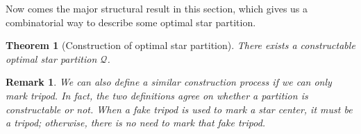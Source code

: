 \documentclass[10pt,a4paper]{article}
\newtheorem{theorem}{Theorem}[section]
\newtheorem{remark}{Remark}[section]
\begin{document}
Now comes the major structural result in this section, which gives us a combinatorial way to describe some optimal star partition. 

\begin{theorem}[Construction of optimal star partition]
    \label{thm:constructability}
    There exists a constructable optimal star partition $\mathcal{Q}$. 
\end{theorem}

\begin{remark}
    We can also define a similar construction process if we can only mark tripod. 
    In fact, the two definitions agree on whether a partition is constructable or not. 
    When a fake tripod is used to mark a star center, it must be a tripod; otherwise, there is no need to mark that fake tripod. 
\end{remark}
\end{document}
